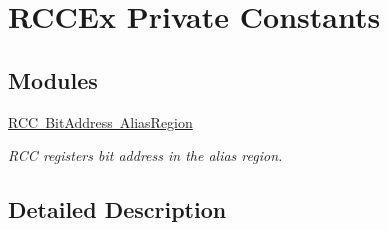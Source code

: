 \hypertarget{group___r_c_c_ex___private___constants}{}\section{R\+C\+C\+Ex Private Constants}
\label{group___r_c_c_ex___private___constants}
\subsection*{Modules}
\begin{DoxyCompactItemize}
\item 
\mbox{\hyperlink{group___r_c_c_ex___bit_address___alias_region}{R\+C\+C Bit\+Address Alias\+Region}}
\begin{DoxyCompactList}\small\item\em R\+CC registers bit address in the alias region. \end{DoxyCompactList}\end{DoxyCompactItemize}


\subsection{Detailed Description}
